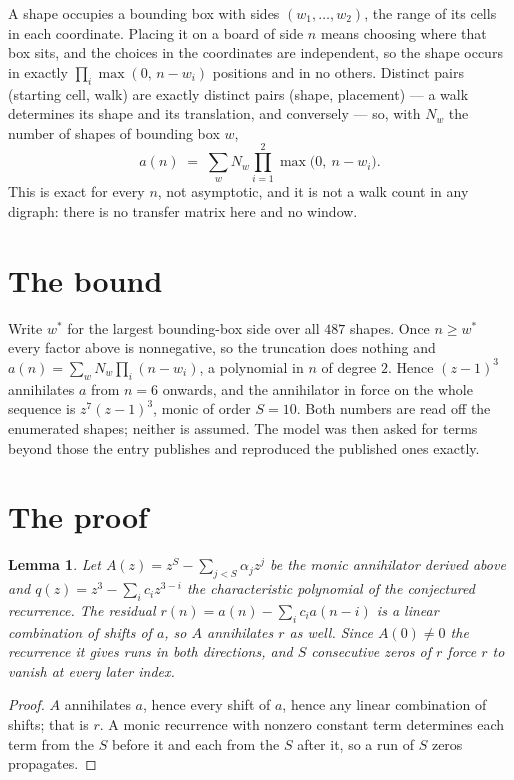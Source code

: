 \documentclass[11pt,a4paper]{article}
\theoremstyle{plain}
\newtheorem{lemma}[theorem]{Lemma}
\theoremstyle{definition}
\begin{document}
A shape occupies a bounding box with sides $(w_1,\dots,w_{2})$, the range of its cells in each
coordinate. Placing it on a board of side $n$ means choosing where that box sits, and the
choices in the coordinates are independent, so the shape occurs in exactly
$\prod_{i}\max(0,\,n-w_i)$ positions and in no others. Distinct pairs (starting cell,
walk) are exactly distinct pairs (shape, placement) --- a walk determines its shape and its
translation, and conversely --- so, with $N_w$ the number of shapes of bounding box $w$,
\[
a(n)\;=\;\sum_{w} N_w \prod_{i=1}^{2}\max\bigl(0,\ n-w_i\bigr).
\]
This is exact for every $n$, not asymptotic, and it is not a walk count in any digraph: there is
no transfer matrix here and no window.

\section{The bound}

Write $w^\ast$ for the largest bounding-box side over all $487$ shapes. Once $n\ge w^\ast$
every factor above is nonnegative, so the truncation does nothing and
$a(n)=\sum_w N_w\prod_i(n-w_i)$, a polynomial in $n$ of degree $2$. Hence $(z-1)^{3}$
annihilates $a$ from $n=6$ onwards, and the annihilator in force on the whole sequence is
$z^{7}(z-1)^{3}$, monic of order $S=10$. Both numbers are read off the enumerated
shapes; neither is assumed. The model was then asked for terms beyond those the entry publishes
and reproduced the published ones exactly.

\section{The proof}

\begin{lemma}\label{lem:crit}
Let $A(z)=z^S-\sum_{j<S}\alpha_jz^{j}$ be the monic annihilator derived above and
$q(z)=z^{3}-\sum_ic_iz^{3-i}$ the characteristic polynomial of the conjectured
recurrence. The residual $r(n)=a(n)-\sum_ic_ia(n-i)$ is a linear combination of shifts of $a$,
so $A$ annihilates $r$ as well. Since $A(0)\ne0$ the recurrence it gives runs in both
directions, and $S$ consecutive zeros of $r$ force $r$ to vanish at every later index.
\end{lemma}

\begin{proof}
$A$ annihilates $a$, hence every shift of $a$, hence any linear combination of shifts; that is
$r$. A monic recurrence with nonzero constant term determines each term from the $S$ before it
and each from the $S$ after it, so a run of $S$ zeros propagates.
\end{proof}
\end{document}
